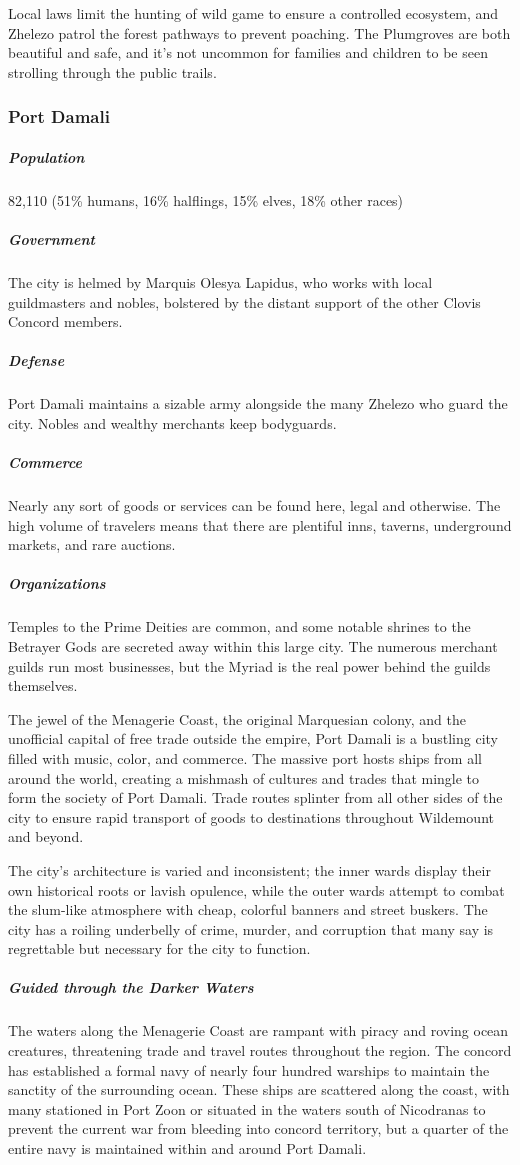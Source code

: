 \documentclass[10pt,a4paper,twoside,bg=print,twocolumn,openany,nodeprecatedcode]{dndbook}
\begin{document}
Local laws limit the hunting of wild game to ensure a controlled ecosystem, and Zhelezo patrol the forest pathways to prevent poaching. The Plumgroves are both beautiful and safe, and it's not uncommon for families and children to be seen strolling through the public trails.

\subsubsection{Port Damali}
\subparagraph{Population}
82,110 (51\% humans, 16\% halflings, 15\% elves, 18\% other races)

\subparagraph{Government}
The city is helmed by Marquis Olesya Lapidus, who works with local guildmasters and nobles, bolstered by the distant support of the other Clovis Concord members.

\subparagraph{Defense}
Port Damali maintains a sizable army alongside the many Zhelezo who guard the city. Nobles and wealthy merchants keep bodyguards.

\subparagraph{Commerce}
Nearly any sort of goods or services can be found here, legal and otherwise. The high volume of travelers means that there are plentiful inns, taverns, underground markets, and rare auctions.

\subparagraph{Organizations}
Temples to the Prime Deities are common, and some notable shrines to the Betrayer Gods are secreted away within this large city. The numerous merchant guilds run most businesses, but the Myriad is the real power behind the guilds themselves.

The jewel of the Menagerie Coast, the original Marquesian colony, and the unofficial capital of free trade outside the empire, Port Damali is a bustling city filled with music, color, and commerce. The massive port hosts ships from all around the world, creating a mishmash of cultures and trades that mingle to form the society of Port Damali. Trade routes splinter from all other sides of the city to ensure rapid transport of goods to destinations throughout Wildemount and beyond.

The city's architecture is varied and inconsistent; the inner wards display their own historical roots or lavish opulence, while the outer wards attempt to combat the slum-like atmosphere with cheap, colorful banners and street buskers. The city has a roiling underbelly of crime, murder, and corruption that many say is regrettable but necessary for the city to function.

\subparagraph{Guided through the Darker Waters}
The waters along the Menagerie Coast are rampant with piracy and roving ocean creatures, threatening trade and travel routes throughout the region. The concord has established a formal navy of nearly four hundred warships to maintain the sanctity of the surrounding ocean. These ships are scattered along the coast, with many stationed in Port Zoon or situated in the waters south of Nicodranas to prevent the current war from bleeding into concord territory, but a quarter of the entire navy is maintained within and around Port Damali.
\end{document}
